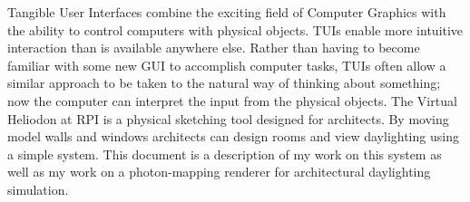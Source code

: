  

Tangible User Interfaces combine the exciting field of Computer Graphics with the ability to control computers with physical objects.  TUIs enable more intuitive interaction than is available anywhere else.  Rather than having to become familiar with some new GUI to accomplish computer tasks, TUIs often allow a similar approach to be taken to the natural way of thinking about something; now the computer can interpret the input from the physical objects.  The Virtual Heliodon at RPI is a physical sketching tool designed for architects.  By moving model walls and windows architects can design rooms and view daylighting using a simple system.  This document is a description of my work on this system as well as my work on a photon-mapping renderer for architectural daylighting simulation.
 
\begin{comment}
Tangible User Interfaces are a growing field in Computer Science where the efficiency of using computers to complete everyday tasks is combined with tangibly interacting with the world in order to make an effective interface to do modern tasks.  The RPI Computer Graphics research group has been developing a Virtual Heliodon Tangible User Interface in order to effectively do Daylighting Simulations.  In addition, three user studies have been done to measure the effectiveness of this tool.  This document discusses the system currently in place, surveys the field of Tangible User Interfaces, investigates the field of user studies, and details future work which could be done in this group in this field.
\end{comment}
